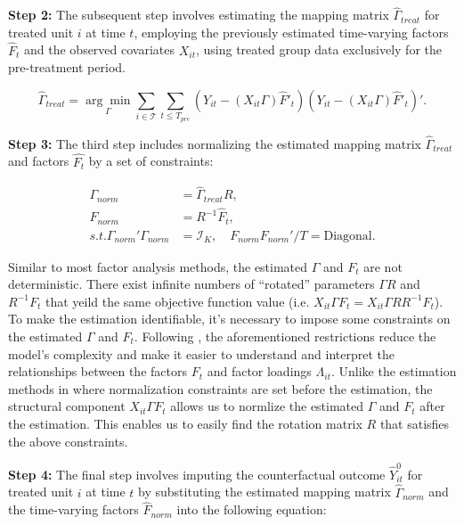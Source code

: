 \documentclass[12pt]{article}
\begin{document}
\textbf{Step 2:} The subsequent step involves estimating the mapping matrix $\hat{\Gamma}_{treat}$ for treated unit $i$ at time $t$, employing the previously estimated time-varying factors $\hat{F}_t$ and the observed covariates $X_{it}$, using treated group data exclusively for the pre-treatment period.

\begin{equation}
\hat{\Gamma}_{treat} = \underset{\Gamma}{\arg\min} \sum_{i \in \mathcal{T}} \sum_{t \leq T_{pre}} \left( Y_{it} - (X_{it} \Gamma) \hat{F}'_{t} \right) \left( Y_{it} - (X_{it} \Gamma) \hat{F}'_{t} \right)'.
\end{equation}

\textbf{Step 3:} The third step includes normalizing the estimated mapping matrix $\hat{\Gamma}_{treat}$ and factors $\hat{F_t}$ by a set of constraints:

\begin{equation}
\label{eqn: normalization}
\begin{aligned}
\Gamma_{norm} &= \hat{\Gamma}_{treat} R, \\
F_{norm} &= R^{-1} \hat{F}_t, \\
s.t. \Gamma_{norm}'\Gamma_{norm} &= \mathcal{I}_K, \quad F_{norm} F_{norm}'/T = \text{Diagonal}.
\end{aligned}
\end{equation}

Similar to most factor analysis methods, the estimated $\Gamma$ and $F_t$ are not deterministic. There exist infinite numbers of ``rotated'' parameters $\Gamma R$ and $R^{-1}F_t$ that yeild the same objective function value (i.e. $X_{it}\Gamma F_t = X_{it} \Gamma R R^{-1} F_t$). To make the estimation identifiable, it's necessary to impose some constraints on the estimated $\Gamma$ and $F_t$. Following \cite{connor1993test, stock2002forecasting, bai2002determining}, the aforementioned restrictions reduce the model's complexity and make it easier to understand and interpret the relationships between the factors $F_t$ and factor loadings $\Lambda_{it}$. Unlike the estimation methods in \cite{bai2009panel,xu2017generalized} where normalization constraints are set before the estimation, the structural component $X_{it}\Gamma F_t$ allows us to normlize the estimated $\Gamma$ and $F_t$ after the estimation. This enables us to easily find the rotation matrix $R$ that satisfies the above constraints.


\textbf{Step 4:} The final step involves imputing the counterfactual outcome $\hat{Y}_{it}^0$ for treated unit $i$ at time $t$ by substituting the estimated mapping matrix $\hat{\Gamma}_{norm}$ and the time-varying factors $\hat{F}_{norm}$ into the following equation:
\end{document}
